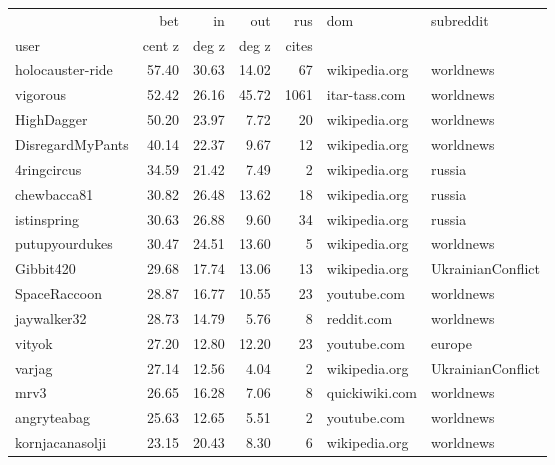 \begin{tabular}{lrrrrll}
\toprule
 & bet & in & out & rus & dom & subreddit \\
user & cent z & deg z & deg z & cites & & \\
\midrule
holocauster-ride &       57.40 &     30.63 &      14.02 &         67 &   wikipedia.org &          worldnews \\
vigorous         &       52.42 &     26.16 &      45.72 &       1061 &   itar-tass.com &          worldnews \\
HighDagger       &       50.20 &     23.97 &       7.72 &         20 &   wikipedia.org &          worldnews \\
DisregardMyPants &       40.14 &     22.37 &       9.67 &         12 &   wikipedia.org &          worldnews \\
4ringcircus      &       34.59 &     21.42 &       7.49 &          2 &   wikipedia.org &             russia \\
chewbacca81      &       30.82 &     26.48 &      13.62 &         18 &   wikipedia.org &             russia \\
istinspring      &       30.63 &     26.88 &       9.60 &         34 &   wikipedia.org &             russia \\
putupyourdukes   &       30.47 &     24.51 &      13.60 &          5 &   wikipedia.org &          worldnews \\
Gibbit420        &       29.68 &     17.74 &      13.06 &         13 &   wikipedia.org &  UkrainianConflict \\
SpaceRaccoon     &       28.87 &     16.77 &      10.55 &         23 &     youtube.com &          worldnews \\
jaywalker32      &       28.73 &     14.79 &       5.76 &          8 &      reddit.com &          worldnews \\
vityok           &       27.20 &     12.80 &      12.20 &         23 &     youtube.com &             europe \\
varjag           &       27.14 &     12.56 &       4.04 &          2 &   wikipedia.org &  UkrainianConflict \\
mrv3             &       26.65 &     16.28 &       7.06 &          8 &   quickiwiki.com &          worldnews \\
angryteabag      &       25.63 &     12.65 &       5.51 &          2 &     youtube.com &          worldnews \\
kornjacanasolji  &       23.15 &     20.43 &       8.30 &          6 &   wikipedia.org &          worldnews \\

\end{tabular}
